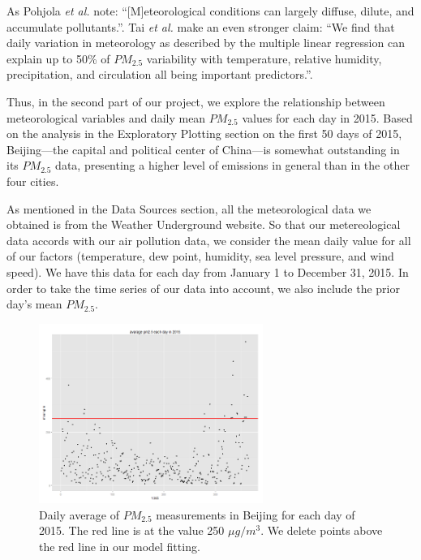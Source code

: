 \documentclass[11pt]{article} %
\begin{document}
As Pohjola \textit{et al.} note: “[M]eteorological conditions can largely diffuse, dilute, and accumulate pollutants.”\cite{Pohjola02}. Tai \textit{et al.} make an even stronger claim: “We find that daily variation in meteorology as described by the multiple linear regression can explain up to 50\% of \(PM_{2.5}\) variability with temperature, relative humidity, precipitation, and circulation all being important predictors.”\cite{Tai10}.
 
Thus, in the second part of our project, we explore the relationship between meteorological variables and daily mean \(PM_{2.5}\) values for each day in 2015. 
Based on the analysis in the Exploratory Plotting section on the first 50 days of 2015, Beijing---the capital and political center of China---is somewhat outstanding in its \(PM_{2.5}\) data, presenting a higher level of emissions in general than in the other four cities.

As mentioned in the Data Sources section, all the meteorological data we obtained is from the Weather Underground website. So that our metereological data accords with our air pollution data, we consider the mean daily value for all of our factors (temperature, dew point, humidity, sea level pressure, and wind speed). We have this data for each day from January 1 to December 31, 2015. In order to take the time series of our data into account, we also include the prior day's mean \(PM_{2.5}\).

 \begin{figure}[!ht]
  \centering
    \includegraphics[width=0.65\textwidth]{Figure2-1}
      \caption{Daily average of \(PM_{2.5}\) measurements in Beijing for each day of 2015. The red line is at the value 250 \(\mu g / m^3\). We delete points above the red line in our model fitting.}
\end{figure}
\end{document}
